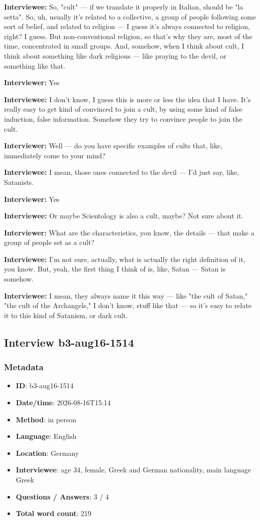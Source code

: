 \textbf{Interviewee:} So, "cult" — if we translate it properly in Italian, should be "la setta". So, uh, usually it's related to a collective, a group of people following some sort of belief, and related to religion — I guess it's always connected to religion, right? I guess. But non-conventional religion, so that's why they are, most of the time, concentrated in small groups. And, somehow, when I think about cult, I think about something like dark religious — like praying to the devil, or something like that.

\textbf{Interviewer:} Yes

\textbf{Interviewee:} I don't know, I guess this is more or less the idea that I have. It's really easy to get kind of convinced to join a cult, by using some kind of false induction, false information. Somehow they try to convince people to join the cult.

\textbf{Interviewer:} Well — do you have specific examples of cults that, like, immediately come to your mind?

\textbf{Interviewee:} I mean, those ones connected to the devil — I'd just say, like, Satanists.

\textbf{Interviewer:} Yes

\textbf{Interviewee:} Or maybe Scientology is also a cult, maybe? Not sure about it.

\textbf{Interviewer:} What are the characteristics, you know, the details — that make a group of people set as a cult?

\textbf{Interviewee:} I'm not sure, actually, what is actually the right definition of it, you know. But, yeah, the first thing I think of is, like, Satan — Satan is somehow.

\textbf{Interviewee:} I mean, they always name it this way — like "the cult of Satan," "the cult of the Archangels," I don't know, stuff like that — so it's easy to relate it to this kind of Satanism, or dark cult.

\subsection{Interview b3-aug16-1514}\label{int:b3-aug16-1514}
\subsubsection*{Metadata}
\begin{itemize}
  \item \textbf{ID}: b3-aug16-1514
  \item \textbf{Date/time}: 2026-08-16T15:14
  \item \textbf{Method}: in person
  \item \textbf{Language}: English
  \item \textbf{Location}: Germany
  \item \textbf{Interviewee}: age 34, female, Greek and German nationality, main language Greek
  \item \textbf{Questions / Answers}: 3 / 4
  \item \textbf{Total word count}: 219
\end{itemize}
